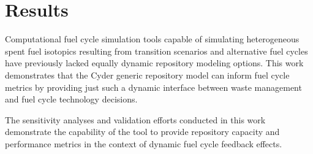 \section{Results}

Computational fuel cycle simulation tools capable of simulating heterogeneous spent fuel 
isotopics resulting from transition scenarios and alternative fuel cycles have 
previously lacked equally dynamic repository modeling options.  This work 
demonstrates that the Cyder generic repository model can inform fuel cycle 
metrics by providing just such a dynamic interface between waste management and fuel cycle technology decisions. 

The sensitivity analyses and validation efforts conducted in this work 
demonstrate the capability of the \Cyder tool to provide repository capacity and 
performance metrics in the context of dynamic fuel cycle feedback effects.
